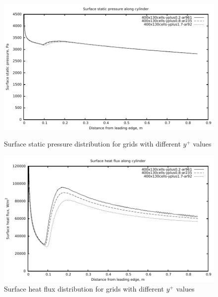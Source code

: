 \begin{figure}[h]
 \begin{center}
  \includegraphics[width=15cm]{./chap3-mallinson-cylinder/figs/compare-yplus-pressure.pdf}
 \end{center}
 \caption{Surface static pressure distribution for grids with different $y^+$ values}
 \label{cylinder-surface-static-pressure-compare-yplus}
\vspace{2cm}
 \begin{center}
  \includegraphics[width=15cm]{./chap3-mallinson-cylinder/figs/compare-yplus-heat-flux.pdf}
 \end{center}
 \caption{Surface heat flux distribution for grids with different $y^+$ values}
 \label{cylinder-surface-heat-flux-compare-yplus}
\end{figure}

